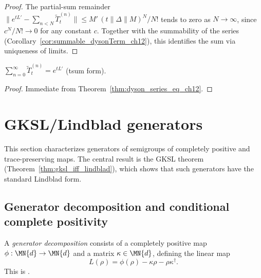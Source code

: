 \begin{proof}
    \leanok
    The partial-sum remainder
    $\|e^{tL'} - \sum_{n<N}\widetilde{T}^{(n)}_t\|
        \le M'\,(t\|\Delta\|M)^N/N!$
    tends to zero as $N \to \infty$, since $c^N/N! \to 0$ for any
    constant $c$. Together with the summability of the series
    (Corollary~\ref{cor:summable_dysonTerm_ch12}), this identifies
    the sum via uniqueness of limits.
\end{proof}

\begin{corollary}
    \label{cor:tsum_dysonTerm_eq_ch12}
    \leanok
    $\sum_{n=0}^{\infty} \widetilde{T}^{(n)}_t = e^{tL'}$
    (tsum form).
\end{corollary}

\begin{proof}
    \leanok
    Immediate from Theorem~\ref{thm:dyson_series_eq_ch12}.
\end{proof}

\section{GKSL/Lindblad generators}
\label{sec:gksl_generators}

This section characterizes generators of semigroups of completely
positive and trace-preserving maps.
The central result is the GKSL theorem
(Theorem~\ref{thm:gksl_iff_lindblad}),
which shows that such generators have the standard Lindblad form.

\subsection{Generator decomposition and conditional complete positivity}

\begin{definition}\label{def:generator_decomp}
    \leanok
    A \emph{generator decomposition} consists of a completely positive map
    $\phi : \MN{d} \to \MN{d}$ and a matrix $\kappa \in \MN{d}$, defining
    the linear map
    \[
        L(\rho) = \phi(\rho) - \kappa\rho - \rho\kappa^\dagger.
    \]
    This is \cite[Equation~(7.14)]{Wolf2012Quantum}.
\end{definition}

